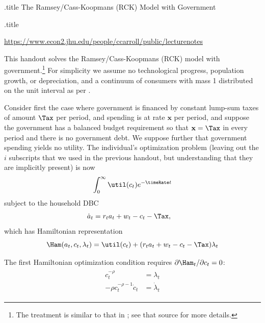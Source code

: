 \documentclass{handout}\usepackage{handoutSetup}\usepackage{handoutShortcuts}
\begin{document}
\handoutHeader

\begin{verbatimwrite}{\jobname.title}
The Ramsey/Cass-Koopmans (RCK) Model with Government
\end{verbatimwrite}

\centerline{\LARGE  \jobname.title}
\medskip 
\centerline{\url{https://www.econ2.jhu.edu/people/ccarroll/public/lecturenotes}}

\medskip \medskip

This handout solves the Ramsey/Cass-Koopmans (RCK) model with government.\footnote{The treatment is similar
to that in \cite{blanchard&fischer:text}; see that source for more details.}  For simplicity we assume
no technological progress, population growth, or depreciation, and a 
continuum of consumers with mass 1 distributed on the unit interval
as per .

Consider first the case where government is financed by constant 
lump-sum taxes of amount $\Tax$ per period, and spending is at rate 
$\mathbf{x}$ per period, and suppose the government has a balanced budget 
requirement so that $\mathbf{x} = \Tax$ in every period and there is no 
government debt.  We suppose further that government spending yields 
no utility.  The individual's optimization problem (leaving out the $i$ 
subscripts that we used in the previous handout, but understanding that 
they are implicitly present) is now
\begin{equation}\begin{gathered}\begin{aligned}
        \int_{0}^{\infty} \util(c_{t}) e^{-\timeRate t}
\end{aligned}\end{gathered}\end{equation}
subject to the household DBC
\begin{equation}\begin{gathered}\begin{aligned}
        \dot{a}_{t} & =  r_{t} a_{t} + w_{t} - c_{t} - \Tax, \label{eq:hhbc}
\end{aligned}\end{gathered}\end{equation}
which has Hamiltonian representation
\begin{displaymath}
        \Ham(a_{t},c_{t},\lambda_{t}) = \util(c_{t}) + (r_{t}a_{t} + w_{t} - c _{t} - \Tax)\lambda_{t}
\end{displaymath}

The first Hamiltonian optimization condition requires $\partial 
\Ham_{t}/\partial c_{t} = 0$:
\begin{equation}\begin{gathered}\begin{aligned}
        c_{t}^{-\rho} & =  \lambda _{t}  \label{eq:H1A} \\
        -\rho c^{-\rho-1}_{t}\dot{c}_{t} & =  \dot{\lambda}_{t}
\end{aligned}\end{gathered}\end{equation}
\end{document}

